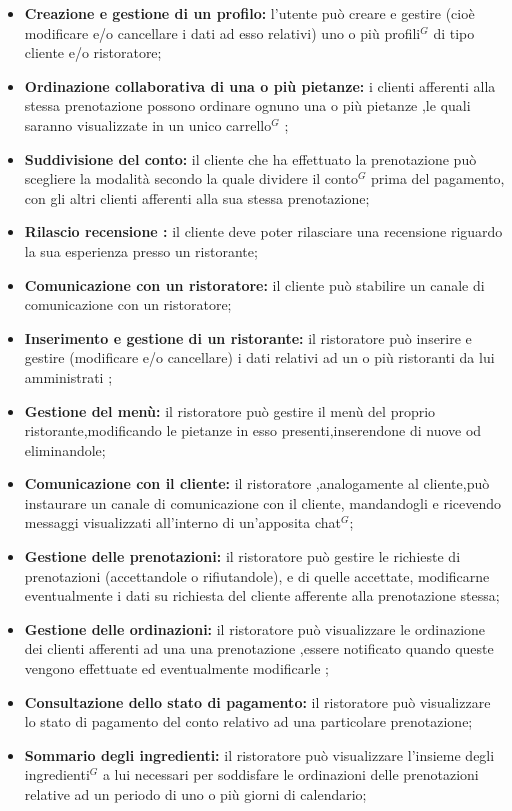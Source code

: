 \begin{itemize}
    \item \textbf{Creazione e gestione di un profilo:} l'utente può creare e gestire (cioè modificare e/o 
    cancellare i dati ad esso relativi) uno o più profili$^{G}$ di tipo cliente e/o ristoratore;
    \item \textbf{Ordinazione collaborativa di una o più pietanze:} i clienti afferenti alla stessa prenotazione
    possono ordinare ognuno una o più pietanze ,le quali saranno visualizzate in un unico carrello$^{G}$ ;
    \item \textbf{Suddivisione del conto:} il cliente che ha effettuato la prenotazione può scegliere la modalità secondo la quale 
    dividere il conto$^{G}$ prima del pagamento, con gli altri clienti afferenti alla sua stessa prenotazione;
    \item \textbf{Rilascio recensione :} il cliente deve poter rilasciare una recensione riguardo la sua
    esperienza presso un ristorante;
    \item \textbf{Comunicazione con un ristoratore:} il cliente può stabilire un canale di comunicazione con un
    ristoratore;
    \item \textbf{Inserimento e gestione di un ristorante:} il ristoratore può inserire e gestire (modificare e/o cancellare)
    i dati relativi ad un o più ristoranti da lui amministrati ;
    \item \textbf{Gestione del menù:} il ristoratore può gestire il menù del proprio ristorante,modificando le pietanze in esso 
    presenti,inserendone di nuove od eliminandole;
    \item \textbf{Comunicazione con il cliente:} il ristoratore ,analogamente al cliente,può instaurare un canale di comunicazione
    con il cliente, mandandogli e ricevendo messaggi visualizzati all'interno di un'apposita chat$^{G}$;
    \item \textbf{Gestione delle prenotazioni:} il ristoratore può gestire le richieste di prenotazioni (accettandole o rifiutandole), e 
    di quelle accettate, modificarne eventualmente i dati su richiesta del cliente afferente alla prenotazione stessa;
    \item \textbf{Gestione delle ordinazioni:} il ristoratore può visualizzare le ordinazione dei clienti afferenti ad una
    una prenotazione ,essere notificato quando queste vengono effettuate ed eventualmente modificarle ;
    \item \textbf{Consultazione dello stato di pagamento:} il ristoratore può visualizzare lo stato di pagamento del conto relativo ad una
    particolare prenotazione;
    \item \textbf{Sommario degli ingredienti:} il ristoratore può visualizzare l'insieme degli ingredienti$^{G}$ a lui necessari per soddisfare 
    le ordinazioni delle prenotazioni  relative ad un periodo di uno o più giorni di calendario;
\end{itemize}